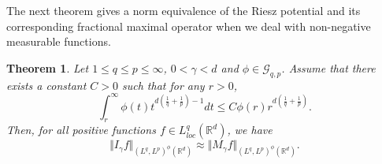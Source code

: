 \documentclass[a4paper,12pt,intlimits,oneside]{amsart}
\numberwithin{equation}{section}
\newtheorem{theorem}{Theorem}[section]
\numberwithin{equation}{section}
\theoremstyle{definition}
\begin{document}
The next theorem gives a norm equivalence of the Riesz potential and its corresponding fractional maximal operator when we deal with non-negative
measurable functions. 
\begin{theorem}
\label{Theo 3.4}
Let $1\leq  q \leq p \leq \infty$, $0<\gamma< d$ and $\phi \in \mathcal{G}_{q,p}$. Assume that there exists a constant $ C>0 $ such that for any $ r>0 $,
\begin{equation}\label{eq 44}
 \displaystyle\int_{r}^{\infty} \phi(t)t^{d(\frac{1}{q}+\frac{1}{p})-1} dt \leq C   \phi(r)r^{d(\frac{1}{q}+\frac{1}{p})}.
\end{equation}
 Then, for all positive functions $ f \in L_{loc}^{q}(\mathbb{R}^{d})$, we have
$$ \Vert I_{\gamma}f \Vert_{(L^{q},L^{p})^{\phi}(\mathbb{R}^{d})}  \approx   \Vert M_{\gamma}f \Vert_{(L^{q},L^{p})^{\phi}(\mathbb{R}^{d})}. $$
\end{theorem}
\end{document}
